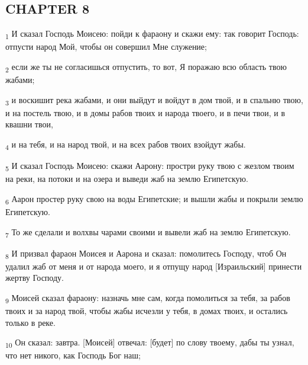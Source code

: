 \subsection{CHAPTER 8}
\begin{tcolorbox}
\textsubscript{1} И сказал Господь Моисею: пойди к фараону и скажи ему: так говорит Господь: отпусти народ Мой, чтобы он совершил Мне служение;
\end{tcolorbox}
\begin{tcolorbox}
\textsubscript{2} если же ты не согласишься отпустить, то вот, Я поражаю всю область твою жабами;
\end{tcolorbox}
\begin{tcolorbox}
\textsubscript{3} и воскишит река жабами, и они выйдут и войдут в дом твой, и в спальню твою, и на постель твою, и в домы рабов твоих и народа твоего, и в печи твои, и в квашни твои,
\end{tcolorbox}
\begin{tcolorbox}
\textsubscript{4} и на тебя, и на народ твой, и на всех рабов твоих взойдут жабы.
\end{tcolorbox}
\begin{tcolorbox}
\textsubscript{5} И сказал Господь Моисею: скажи Аарону: простри руку твою с жезлом твоим на реки, на потоки и на озера и выведи жаб на землю Египетскую.
\end{tcolorbox}
\begin{tcolorbox}
\textsubscript{6} Аарон простер руку свою на воды Египетские; и вышли жабы и покрыли землю Египетскую.
\end{tcolorbox}
\begin{tcolorbox}
\textsubscript{7} То же сделали и волхвы чарами своими и вывели жаб на землю Египетскую.
\end{tcolorbox}
\begin{tcolorbox}
\textsubscript{8} И призвал фараон Моисея и Аарона и сказал: помолитесь Господу, чтоб Он удалил жаб от меня и от народа моего, и я отпущу народ [Израильский] принести жертву Господу.
\end{tcolorbox}
\begin{tcolorbox}
\textsubscript{9} Моисей сказал фараону: назначь мне сам, когда помолиться за тебя, за рабов твоих и за народ твой, чтобы жабы исчезли у тебя, в домах твоих, и остались только в реке.
\end{tcolorbox}
\begin{tcolorbox}
\textsubscript{10} Он сказал: завтра. [Моисей] отвечал: [будет] по слову твоему, дабы ты узнал, что нет никого, как Господь Бог наш;
\end{tcolorbox}
